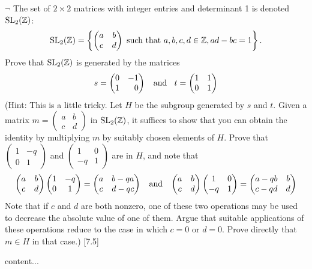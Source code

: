 \begin{exercise}
	$\neg$ The set of $2\times 2$ matrices with integer entries and determinant 1 is denoted $\operatorname{SL}_2(\mathbb{Z})$:
	\[
		\operatorname{SL}_2(\mathbb{Z}) = 
		\left\{
			\begin{pmatrix}
				a & b \\
				c & d
			\end{pmatrix}
			\textnormal{ such that }
			a,b,c,d\in \mathbb{Z},
			ad - bc = 1
		\right\}.
	\]
	Prove that $\operatorname{SL}_2(\mathbb{Z})$ is generated by the matrices
	\[
		s = 
		\begin{pmatrix*}[r]
			0 & -1 \\
			1 & 0
		\end{pmatrix*}
		\;\;
		\textnormal{ and }
		\;\;
		t = 
		\begin{pmatrix*}[r]
			1 & 1 \\
			0 & 1
		\end{pmatrix*}
	\]
	(Hint: This is a little tricky. Let $H$ be the subgroup generated by $s$ and $t$. Given a matrix $m = \begin{pmatrix} a & b \\ c & d\end{pmatrix}$ in $\operatorname{SL}_2(\mathbb{Z})$, it suffices to show that you can obtain the identity by multiplying $m$ by suitably chosen elements of $H$. Prove that $\begin{pmatrix} 1 & -q \\ 0 & 1\end{pmatrix}$ and  $\begin{pmatrix} 1 & 0 \\ -q & 1\end{pmatrix}$ are in $H$, and note that
	\[
		\begin{pmatrix}
			a & b\\
			c & d
		\end{pmatrix}
		\begin{pmatrix} 1 & -q \\ 0 & 1\end{pmatrix} 
		=
		\begin{pmatrix}
			a & b-qa \\
			c & d-qc
		\end{pmatrix}
		\;\;
		\textnormal{ and }
		\;\;
		\begin{pmatrix}
			a & b\\
			c & d
		\end{pmatrix}
		\begin{pmatrix} 1 & 0 \\ -q & 1\end{pmatrix}
		=
		\begin{pmatrix}
			a - qb & b \\
			c - qd & d
		\end{pmatrix}
	\]
	Note that if $c$ and $d$ are both nonzero, one of these two operations may be used to decrease the absolute value of one of them. Argue that suitable applications of these operations reduce to the case in which $c = 0$ or $d = 0$. Prove directly that $m\in H$ in that case.) [7.5]
\end{exercise}
\begin{solution}
	content...
\end{solution}

